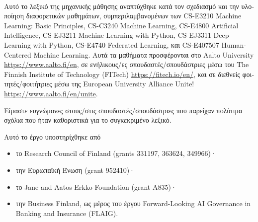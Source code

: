 \documentclass[journal,12pt,onecolumn]{article}
\begin{document}
\newpage 
{}\ %

\noindent \foreignlanguage{greek}{Αυτό το λεξικό της μηχανικής μάθησης αναπτύχθηκε κατά τον σχεδιασμό
και την υλοποίηση διαφορετικών μαθημάτων, συμπεριλαμβανομένων των} CS-E3210 Machine Learning: 
Basic Principles, CS-C3240 Machine Learning, CS-E4800 Artificial Intelligence, CS-EJ3211 Machine Learning with 
Python, CS-EJ3311 Deep Learning with Python, CS-E4740 Federated Learning,
\foreignlanguage{greek}{και} CS-E407507 Human-Centered Machine Learning. \foreignlanguage{greek}{Αυτά τα 
μαθήματα προσφέρονται στο} Aalto University \url{https://www.aalto.fi/en}, \foreignlanguage{greek}{σε 
ενήλικους/ες σπουδαστές/σπουδάστριες μέσω του} The Finnish Institute of Technology (FITech) 
\url{https://fitech.io/en/}, \foreignlanguage{greek}{και σε διεθνείς φοιτητές/φοιτήτριες μέσω της} 
European University Alliance Unite! \url{https://www.aalto.fi/en/unite}.

\noindent \foreignlanguage{greek}{Είμαστε ευγνώμονες στους/στις σπουδαστές/σπουδάστριες που παρείχαν 
πολύτιμα σχόλια που ήταν καθοριστικά για το συγκεκριμένο λεξικό.}

\noindent \foreignlanguage{greek}{Αυτό το έργο υποστηρίχθηκε από}
\begin{itemize} 
	\item \foreignlanguage{greek}{το} Research Council of Finland (grants 331197, 363624, 349966)·
	\item \foreignlanguage{greek}{την Ευρωπαϊκή Ένωση} (grant 952410)·
	\item \foreignlanguage{greek}{το} Jane and Aatos Erkko Foundation (grant A835)·
	\item \foreignlanguage{greek}{την} Business Finland, \foreignlanguage{greek}{ως μέρος του έργου} Forward-Looking AI Governance in Banking and Insurance (FLAIG).
\end{itemize} 
\end{document}
